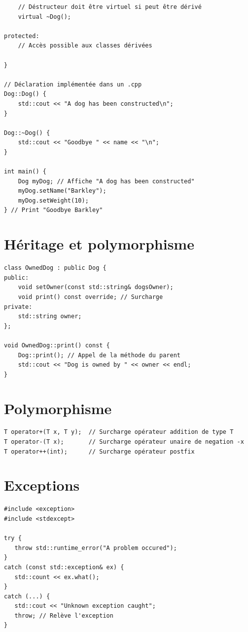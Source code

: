 \documentclass{article}
\begin{document}
\begin{multicols*}{3}
\begin{lstlisting}
    // Déstructeur doit être virtuel si peut être dérivé
    virtual ~Dog();

protected:
    // Accès possible aux classes dérivées

}

// Déclaration implémentée dans un .cpp
Dog::Dog() {
    std::cout << "A dog has been constructed\n";
}

Dog::~Dog() {
    std::cout << "Goodbye " << name << "\n";
}

int main() {
    Dog myDog; // Affiche "A dog has been constructed"
    myDog.setName("Barkley");
    myDog.setWeight(10);
} // Print "Goodbye Barkley"
\end{lstlisting}

\section*{Héritage et polymorphisme}

\begin{lstlisting}
class OwnedDog : public Dog {
public:
    void setOwner(const std::string& dogsOwner);
    void print() const override; // Surcharge
private:
    std::string owner;
};

void OwnedDog::print() const {
    Dog::print(); // Appel de la méthode du parent
    std::cout << "Dog is owned by " << owner << endl;
}
\end{lstlisting}

\section*{Polymorphisme}

\begin{lstlisting}
T operator+(T x, T y);  // Surcharge opérateur addition de type T
T operator-(T x);       // Surcharge opérateur unaire de negation -x
T operator++(int);      // Surcharge opérateur postfix

\end{lstlisting}

\section*{Exceptions}

\begin{lstlisting}
#include <exception>
#include <stdexcept>

try {
   throw std::runtime_error("A problem occured");
}
catch (const std::exception& ex) {
   std::count << ex.what();
}
catch (...) {
   std::cout << "Unknown exception caught";
   throw; // Relève l'exception
}
\end{lstlisting}


\end{multicols*}
\end{document}
